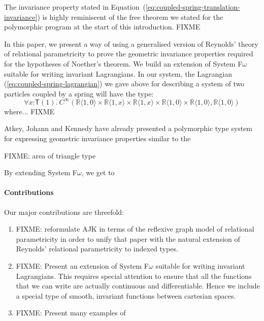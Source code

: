 \documentclass[preprint]{sigplanconf}
\theoremstyle{examplestyle}
\begin{document}
The invariance property stated in
Equation~(\ref{eq:coupled-spring-translation-invariance}) is highly
reminiscent of the free theorem we stated for the polymorphic program
at the start of this introduction. FIXME

In this paper, we present a way of using a generalised version of
Reynolds' theory of relational parametricity to prove the geometric
invariance properties required for the hypotheses of Noether's
theorem. We build an extension of System F$\omega$ suitable for
writing invariant Lagrangians. In our system, the Lagrangian
(\ref{eq:coupled-spring-lagrangian}) we gave above for describing a
system of two particles coupled by a spring will have the type:
\begin{displaymath}
  \forall x \mathord: \mathsf{T}(1).~C^\infty(\mathbb{R}\langle 1, 0 \rangle \times \mathbb{R}\langle 1, x \rangle \times \mathbb{R}\langle 1, x \rangle \times \mathbb{R}\langle 1, 0 \rangle \times \mathbb{R}\langle 1, 0 \rangle, \mathbb{R}\langle 1, 0 \rangle)
\end{displaymath}
where... FIXME

Atkey, Johann and Kennedy \cite{atkey13abstraction} have already
presented a polymorphic type system for expressing geometric
invariance properties similar to the 

FIXME: area of triangle type

By extending System F$\omega$, we get to 

\paragraph{Contributions}

Our major contributions are threefold:
\begin{enumerate}
\item FIXME: reformulate AJK in terms of the reflexive graph model of
  relational parametricity in order to unify that paper with the
  natural extension of Reynolds' relational parametricity to indexed
  types.
\item FIXME: Present an extension of System F$\omega$ suitable for
  writing invariant Lagrangians. This requires special attention to
  ensure that all the functions that we can write are actually
  continuous and differentiable. Hence we include a special type of
  smooth, invariant functions between cartesian spaces.
\item FIXME: Present many examples of 
\end{enumerate}
\end{document}
